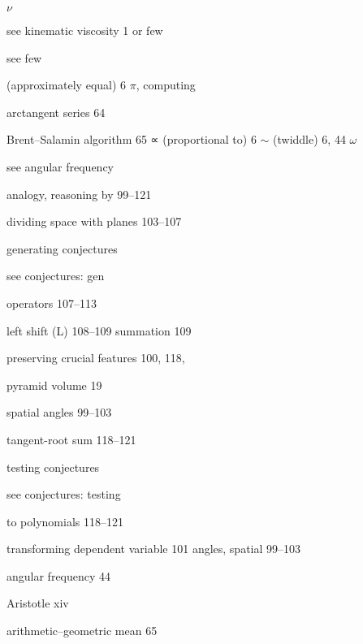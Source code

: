 \documentclass[b5paper]{article}
\begin{document}
\begin{multicols}{2}
$\nu$
  \par see kinematic viscosity
1 or few \par
see few\par
(approximately equal) 6
$\pi$, computing\par
arctangent series 64\par
Brent–Salamin algorithm {}65
∝ (proportional to) 6\quad\quad\quad\quad\quad\quad
$\sim$ (twiddle) 6, 44\quad\quad
$\omega$\par
see angular frequency\par\quad\quad\quad\quad
\par{} \par analogy, reasoning by 99–121\par
dividing space with planes 103–107\par
generating conjectures\par
 \par see conjectures: gen\par\par
operators 107–113\par
left shift (L) 108–109
summation  109\par
preserving crucial features 100, 118,
\par
pyramid volume 19\par
spatial angles 99–103\par
tangent-root sum 118–121\par
testing conjectures\par
\quad \quad see conjectures: testing\par
to polynomials 118–121\par
transforming dependent variable 101
angles, spatial 99–103\par
angular frequency 44\par
Aristotle xiv\par
arithmetic–geometric mean 65\par



\end{multicols}
\end{document}
